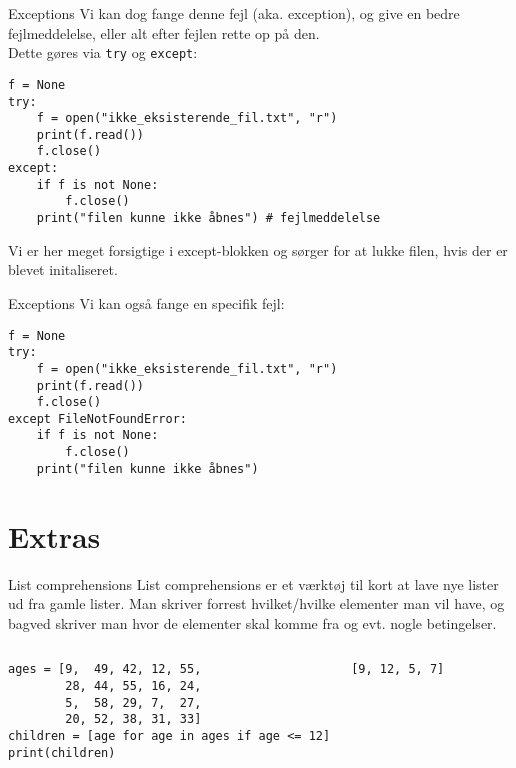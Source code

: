 \begin{frame}[fragile]{Exceptions}
	Vi kan dog fange denne fejl (aka. exception), og give en bedre fejlmeddelelse, eller alt efter fejlen rette op på den.\\
	Dette gøres via \texttt{try} og \texttt{except}:
	\begin{lstlisting}[style=python]
f = None
try:
	f = open("ikke_eksisterende_fil.txt", "r")
	print(f.read())
	f.close()
except:
	if f is not None:
		f.close()
	print("filen kunne ikke åbnes") # fejlmeddelelse
	\end{lstlisting}
Vi er her meget forsigtige i except-blokken og sørger for at lukke filen, hvis der er blevet initaliseret.
\end{frame}

\begin{frame}[fragile]{Exceptions}
	Vi kan også fange en specifik fejl:
	\begin{lstlisting}[style=python]
f = None
try:
	f = open("ikke_eksisterende_fil.txt", "r")
	print(f.read())
	f.close()
except FileNotFoundError:
	if f is not None:
		f.close()
	print("filen kunne ikke åbnes")
	\end{lstlisting}

\end{frame}

\section{Extras}

\begin{frame}[fragile]{List comprehensions}
	List comprehensions er et værktøj til kort at lave nye lister ud fra gamle lister. Man skriver forrest hvilket/hvilke elementer man vil have, og bagved skriver man hvor de elementer skal komme fra og evt. nogle betingelser.
	\begin{columns}
		\begin{lstlisting}[style=python]
ages = [9,  49, 42, 12, 55,
        28, 44, 55, 16, 24, 
        5,  58, 29, 7,  27, 
        20, 52, 38, 31, 33]
children = [age for age in ages if age <= 12]
print(children)
		\end{lstlisting}
		
		\pause
		\begin{lstlisting}[style=python]
[9, 12, 5, 7]
		\end{lstlisting}
	\end{columns}
\end{frame}

